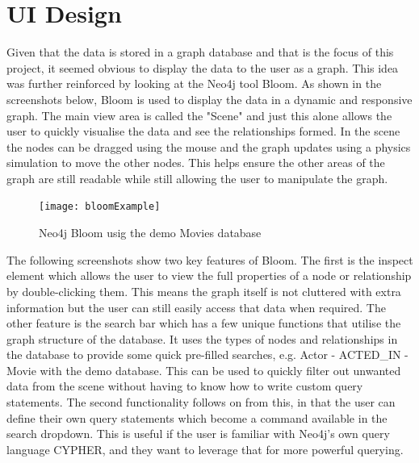 \section{UI Design}
Given that the data is stored in a graph database and that is the focus of this project, it seemed obvious to display the data 
to the user as a graph. This idea was further reinforced by looking at the Neo4j tool Bloom. As shown in the screenshots below, 
Bloom is used to display the data in a dynamic and responsive graph. The main view area is called the "Scene" and just this alone allows 
the user to quickly visualise the data and see the relationships formed. In the scene the nodes can be dragged using the mouse and the graph updates 
using a physics simulation to move the other nodes. This helps ensure the other areas of the graph are still readable while still allowing the 
user to manipulate the graph.
\begin{figure}[H]
    \centering
    \texttt{[image: bloomExample]}
    \caption{Neo4j Bloom usig the demo Movies database}
\end{figure}
The following screenshots show two key features of Bloom. The first is the inspect element which allows the user to view the full properties 
of a node or relationship by double-clicking them. This means the graph itself is not cluttered with extra information but the user can 
still easily access that data when required. The other feature is the search bar which has a few unique functions that utilise the 
graph structure of the database. It uses the types of nodes and relationships in the database to provide some quick pre-filled searches, 
e.g. Actor - ACTED_IN - Movie with the demo database. This can be used to quickly filter out unwanted data from the scene without having to know 
how to write custom query statements. The second functionality follows on from this, in that the user can define their own query statements which 
become a command available in the search dropdown. This is useful if the user is familiar with Neo4j's own query language CYPHER, and they want 
to leverage that for more powerful querying.
